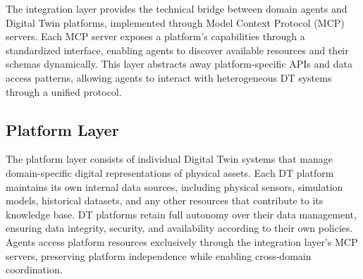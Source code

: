 The integration layer provides the technical bridge between domain agents and Digital Twin platforms,
    implemented through Model Context Protocol (MCP) servers.
Each MCP server exposes a platform's capabilities through a standardized interface,
    enabling agents to discover available resources and their schemas dynamically.
This layer abstracts away platform-specific APIs and data access patterns,
    allowing agents to interact with heterogeneous DT systems through a unified protocol.

\subsection{Platform Layer}
\label{subsec:platform-layer}

The platform layer consists of individual Digital Twin systems
    that manage domain-specific digital representations of physical assets.
Each DT platform maintains its own internal data sources,
    including physical sensors, simulation models, historical datasets,
    and any other resources that contribute to its knowledge base.
DT platforms retain full autonomy over their data management,
    ensuring data integrity, security, and availability according to their own policies.
Agents access platform resources exclusively through the integration layer's MCP servers,
    preserving platform independence while enabling cross-domain coordination.
